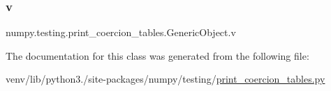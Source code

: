 \subsubsection{\texorpdfstring{v}{v}}
{\footnotesize\ttfamily numpy.\+testing.\+print\+\_\+coercion\+\_\+tables.\+Generic\+Object.\+v}



The documentation for this class was generated from the following file\+:\begin{DoxyCompactItemize}
\item 
venv/lib/python3./site-\/packages/numpy/testing/\hyperlink{print__coercion__tables_8py}{print\+\_\+coercion\+\_\+tables.\+py}\end{DoxyCompactItemize}
